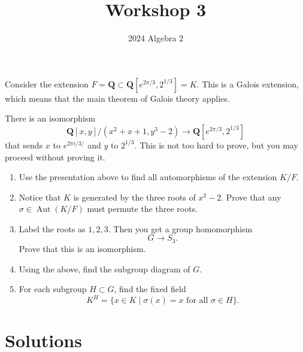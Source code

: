\documentclass[12pt]{amsart}
\author{2024 Algebra 2}
\date{}
\title{Workshop 3}
\begin{document}
\maketitle
Consider the extension \(F = \mathbf{Q} \subset \mathbf{Q}[e^{2\pi/3}, 2^{1/3}] = K\).
This is a Galois extension, which means that the main theorem of Galois theory applies.

There is an isomorphism
\[ \mathbf{Q}[x,y]/(x^2+x+1, y^3-2) \to \mathbf{Q}[e^{2\pi/3}, 2^{1/3}]\]
that sends \(x\) to \(e^{2\pi i /3/}\) and \(y\) to \(2^{1/3}\).
This is not too hard to prove, but you may proceed without proving it.

\begin{enumerate}
\item Use the presentation above to find all automorphisms of the extension \(K/F\).

\item Notice that \(K\) is generated by the three roots of \(x^3-2\).
Prove that any \(\sigma \in \operatorname{Aut}(K/F)\) must permute the three roots.

\item Label the roots as \(1, 2, 3\).
Then you get a group homomorphism
\[ G  \to S_3.\]
Prove that this is an isomorphism.

\item Using the above, find the subgroup diagram of \(G\).

\item For each subgroup \(H \subset G\), find the fixed field
\[ K^H = \{x \in K \mid \sigma (x) = x \text{ for all } \sigma \in H\}.\]
\end{enumerate}
\section{Solutions}
\label{sec:org334e57f}
\end{document}
